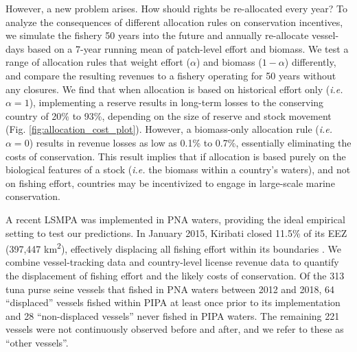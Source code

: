 \documentclass[12pt]{article}
\begin{document}
However, a new problem arises. How should rights be re-allocated every year? To analyze the consequences of different allocation rules on conservation incentives, we simulate the fishery 50 years into the future and annually re-allocate vessel-days based on a 7-year running mean of patch-level effort and biomass. We test a range of allocation rules that weight effort ($\alpha$) and biomass ($1 - \alpha$) differently, and compare the resulting revenues to a fishery operating for 50 years without any closures. We find that when allocation is based on historical effort only (\emph{i.e.} $\alpha = 1$), implementing a reserve results in long-term losses to the conserving country of 20\% to 93\%, depending on the size of reserve and stock movement (Fig. \ref{fig:allocation_cost_plot}). However, a biomass-only allocation rule (\emph{i.e.} $\alpha = 0$) results in revenue losses as low as 0.1\% to 0.7\%, essentially eliminating the costs of conservation. This result implies that if allocation is based purely on the biological features of a stock (\emph{i.e.} the biomass within a country's waters), and not on fishing effort, countries may be incentivized to engage in large-scale marine conservation. 

A recent LSMPA was implemented in PNA waters, providing the ideal empirical setting to test our predictions. In January 2015, Kiribati closed 11.5\% of its EEZ (397,447 km\textsuperscript{2}), effectively displacing all fishing effort within its boundaries \cite{mccauley_2016,mcdermott_2018}. We combine vessel-tracking data \cite{kroodsma_2018} and country-level license revenue data \cite{ffa_2017} to quantify the displacement of fishing effort and the likely costs of conservation. Of the 313 tuna purse seine vessels that fished in PNA waters between 2012 and 2018, 64 ``displaced'' vessels fished within PIPA at least once prior to its implementation and 28 ``non-displaced vessels'' never fished in PIPA waters. The remaining 221 vessels were not continuously observed before and after, and we refer to these as ``other vessels''.
\end{document}
